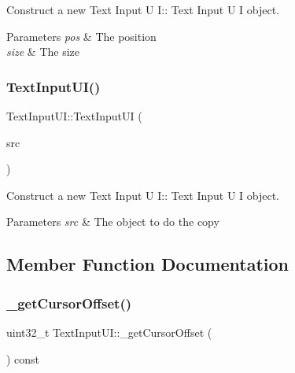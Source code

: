 Construct a new Text Input U I\+:\+: Text Input U I object. 


\begin{DoxyParams}{Parameters}
{\em pos} & The position \\
\hline
{\em size} & The size \\
\hline
\end{DoxyParams}
\mbox{\label{class_text_input_u_i_af8d8c50262fae80a16d80c958dcfc3a0}} 
\subsubsection{\texorpdfstring{Text\+Input\+U\+I()}{TextInputUI()}\hspace{0.1cm}{\footnotesize\ttfamily [2/2]}}
{\footnotesize\ttfamily Text\+Input\+U\+I\+::\+Text\+Input\+UI (\begin{DoxyParamCaption}\item[{\hyperlink{class_text_input_u_i}{Text\+Input\+UI} const \&}]{src }\end{DoxyParamCaption})}



Construct a new Text Input U I\+:\+: Text Input U I object. 


\begin{DoxyParams}{Parameters}
{\em src} & The object to do the copy \\
\hline
\end{DoxyParams}


\subsection{Member Function Documentation}
\mbox{\label{class_text_input_u_i_a1c4f30cc2118a3820843d6933dcbdaea}} 
\subsubsection{\texorpdfstring{\+\_\+get\+Cursor\+Offset()}{\_getCursorOffset()}}
{\footnotesize\ttfamily uint32\+\_\+t Text\+Input\+U\+I\+::\+\_\+get\+Cursor\+Offset (\begin{DoxyParamCaption}{ }\end{DoxyParamCaption}) const\hspace{0.3cm}{\ttfamily [protected]}}



